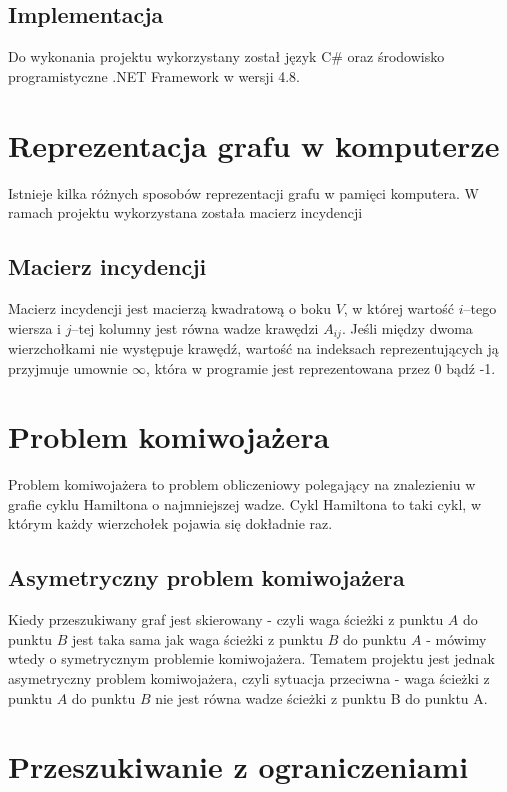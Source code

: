 \documentclass{article}
\begin{document}
\subsection{Implementacja}
Do wykonania projektu wykorzystany został język C\# oraz środowisko programistyczne .NET Framework w wersji 4.8.


\section{Reprezentacja grafu w komputerze}
Istnieje kilka różnych sposobów reprezentacji grafu w pamięci komputera. W ramach projektu wykorzystana została macierz incydencji
\subsection{Macierz incydencji}
Macierz incydencji jest macierzą kwadratową o boku $V$, w której wartość $i$–tego wiersza i $j$–tej kolumny jest równa wadze krawędzi $A_{ij}$. Jeśli między dwoma wierzchołkami nie występuje krawędź, wartość na indeksach reprezentujących ją przyjmuje umownie $\infty$, która w programie jest reprezentowana przez 0 bądź -1.




\section{Problem komiwojażera}
Problem komiwojażera to problem obliczeniowy polegający na znalezieniu w grafie cyklu Hamiltona o najmniejszej wadze. Cykl Hamiltona to taki cykl, w którym każdy wierzchołek pojawia się dokładnie raz. 

\subsection{Asymetryczny problem komiwojażera}
Kiedy przeszukiwany graf jest skierowany - czyli waga ścieżki z punktu $A$ do punktu $B$ jest taka sama jak waga ścieżki z punktu $B$ do punktu $A$
 - mówimy wtedy o symetrycznym problemie komiwojażera. Tematem projektu jest jednak asymetryczny problem komiwojażera, czyli sytuacja przeciwna - waga ścieżki z punktu $A$ do punktu $B$ nie jest równa wadze ścieżki z punktu B do punktu A.



\newpage

\section{Przeszukiwanie z ograniczeniami}
\end{document}
